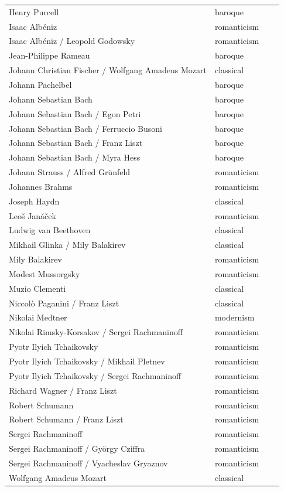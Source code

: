 \documentclass[a4paper]{book}
\begin{document}
\begin{center}
\begin{supertabular}{p{0.75\linewidth}|p{0.25\linewidth}}
Henry Purcell & baroque \\ 
Isaac Albéniz & romanticism \\ 
Isaac Albéniz / Leopold Godowsky & romanticism \\ 
Jean-Philippe Rameau & baroque \\ 
Johann Christian Fischer / Wolfgang Amadeus Mozart & classical \\ 
Johann Pachelbel & baroque \\ 
Johann Sebastian Bach & baroque \\ 
Johann Sebastian Bach / Egon Petri & baroque \\ 
Johann Sebastian Bach / Ferruccio Busoni & baroque \\ 
Johann Sebastian Bach / Franz Liszt & baroque \\ 
Johann Sebastian Bach / Myra Hess & baroque \\ 
Johann Strauss / Alfred Grünfeld & romanticism \\ 
Johannes Brahms & romanticism \\ 
Joseph Haydn & classical \\ 
Leoš Janáček & romanticism \\ 
Ludwig van Beethoven & classical \\ 
Mikhail Glinka / Mily Balakirev & classical \\ 
Mily Balakirev & romanticism \\ 
Modest Mussorgsky & romanticism \\ 
Muzio Clementi & classical \\ 
Niccolò Paganini / Franz Liszt & classical \\ 
Nikolai Medtner & modernism \\ 
Nikolai Rimsky-Korsakov / Sergei Rachmaninoff & romanticism \\ 
Pyotr Ilyich Tchaikovsky & romanticism \\ 
Pyotr Ilyich Tchaikovsky / Mikhail Pletnev & romanticism \\ 
Pyotr Ilyich Tchaikovsky / Sergei Rachmaninoff & romanticism \\ 
Richard Wagner / Franz Liszt & romanticism \\ 
Robert Schumann & romanticism \\ 
Robert Schumann / Franz Liszt & romanticism \\ 
Sergei Rachmaninoff & romanticism \\ 
Sergei Rachmaninoff / György Cziffra & romanticism \\ 
Sergei Rachmaninoff / Vyacheslav Gryaznov & romanticism \\ 
Wolfgang Amadeus Mozart & classical \\ 
\end{supertabular}
\end{center}
\end{document}
